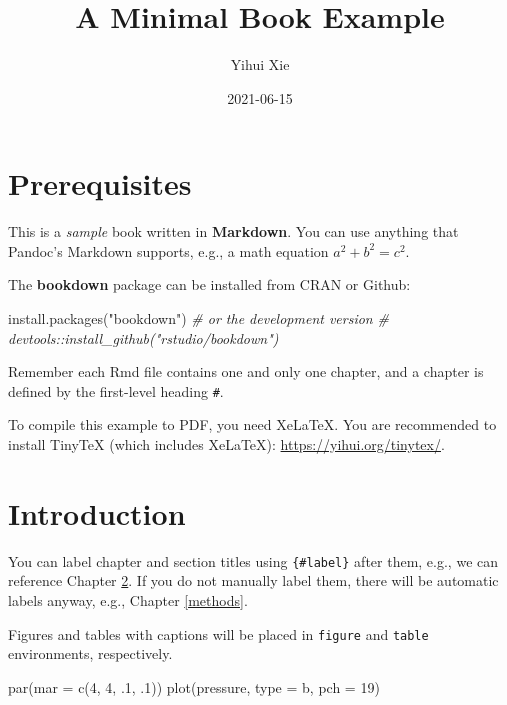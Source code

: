 \documentclass[
]{book}
\title{A Minimal Book Example}
\author{Yihui Xie}
\date{2021-06-15}
\newenvironment{Shaded}{\begin{snugshade}}{\end{snugshade}}
\newcommand{\AttributeTok}[1]{\textcolor[rgb]{0.77,0.63,0.00}{#1}}
\newcommand{\CommentTok}[1]{\textcolor[rgb]{0.56,0.35,0.01}{\textit{#1}}}
\newcommand{\DecValTok}[1]{\textcolor[rgb]{0.00,0.00,0.81}{#1}}
\newcommand{\FunctionTok}[1]{\textcolor[rgb]{0.00,0.00,0.00}{#1}}
\newcommand{\NormalTok}[1]{#1}
\newcommand{\StringTok}[1]{\textcolor[rgb]{0.31,0.60,0.02}{#1}}
\begin{document}
\maketitle

{
\setcounter{tocdepth}{1}
\tableofcontents
}
\hypertarget{prerequisites}{%
\chapter{Prerequisites}\label{prerequisites}}

This is a \emph{sample} book written in \textbf{Markdown}. You can use anything that Pandoc's Markdown supports, e.g., a math equation \(a^2 + b^2 = c^2\).

The \textbf{bookdown} package can be installed from CRAN or Github:

\begin{Shaded}
\begin{Highlighting}[]
\FunctionTok{install.packages}\NormalTok{(}\StringTok{"bookdown"}\NormalTok{)}
\CommentTok{\# or the development version}
\CommentTok{\# devtools::install\_github("rstudio/bookdown")}
\end{Highlighting}
\end{Shaded}

Remember each Rmd file contains one and only one chapter, and a chapter is defined by the first-level heading \texttt{\#}.

To compile this example to PDF, you need XeLaTeX. You are recommended to install TinyTeX (which includes XeLaTeX): \url{https://yihui.org/tinytex/}.

\hypertarget{intro}{%
\chapter{Introduction}\label{intro}}

You can label chapter and section titles using \texttt{\{\#label\}} after them, e.g., we can reference Chapter \ref{intro}. If you do not manually label them, there will be automatic labels anyway, e.g., Chapter \ref{methods}.

Figures and tables with captions will be placed in \texttt{figure} and \texttt{table} environments, respectively.

\begin{Shaded}
\begin{Highlighting}[]
\FunctionTok{par}\NormalTok{(}\AttributeTok{mar =} \FunctionTok{c}\NormalTok{(}\DecValTok{4}\NormalTok{, }\DecValTok{4}\NormalTok{, .}\DecValTok{1}\NormalTok{, .}\DecValTok{1}\NormalTok{))}
\FunctionTok{plot}\NormalTok{(pressure, }\AttributeTok{type =} \StringTok{\textquotesingle{}b\textquotesingle{}}\NormalTok{, }\AttributeTok{pch =} \DecValTok{19}\NormalTok{)}
\end{Highlighting}
\end{Shaded}
\end{document}
